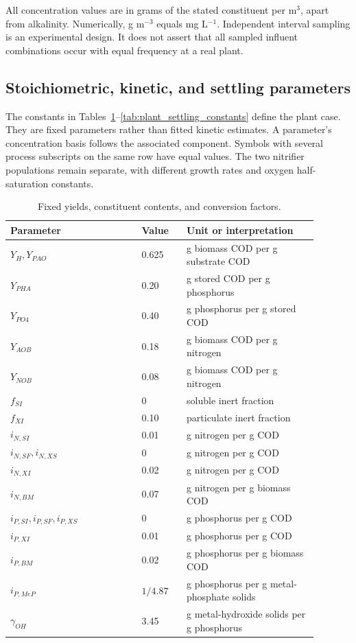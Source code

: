 All concentration values are in grams of the stated constituent per m$^3$, apart from alkalinity. Numerically, g m$^{-3}$ equals mg L$^{-1}$. Independent interval sampling is an experimental design. It does not assert that all sampled influent combinations occur with equal frequency at a real plant.

\subsection{Stoichiometric, kinetic, and settling parameters}

The constants in Tables~\ref{tab:plant_stoichiometric_constants}--\ref{tab:plant_settling_constants} define the plant case. They are fixed parameters rather than fitted kinetic estimates. A parameter's concentration basis follows the associated component. Symbols with several process subscripts on the same row have equal values. The two nitrifier populations remain separate, with different growth rates and oxygen half-saturation constants.

\begin{table}[htbp]
\centering\small
\caption{Fixed yields, constituent contents, and conversion factors.}\label{tab:plant_stoichiometric_constants}
\begin{tabular}{p{0.38\linewidth}p{0.13\linewidth}p{0.38\linewidth}}
\toprule Parameter & Value & Unit or interpretation\\\midrule
$Y_H,Y_{PAO}$ & 0.625 & g biomass COD per g substrate COD\\
$Y_{PHA}$ & 0.20 & g stored COD per g phosphorus\\
$Y_{PO4}$ & 0.40 & g phosphorus per g stored COD\\
$Y_{AOB}$ & 0.18 & g biomass COD per g nitrogen\\
$Y_{NOB}$ & 0.08 & g biomass COD per g nitrogen\\
$f_{SI}$ & 0 & soluble inert fraction\\
$f_{XI}$ & 0.10 & particulate inert fraction\\
$i_{N,SI}$ & 0.01 & g nitrogen per g COD\\
$i_{N,SF},i_{N,XS}$ & 0 & g nitrogen per g COD\\
$i_{N,XI}$ & 0.02 & g nitrogen per g COD\\
$i_{N,BM}$ & 0.07 & g nitrogen per g biomass COD\\
$i_{P,SI},i_{P,SF},i_{P,XS}$ & 0 & g phosphorus per g COD\\
$i_{P,XI}$ & 0.01 & g phosphorus per g COD\\
$i_{P,BM}$ & 0.02 & g phosphorus per g biomass COD\\
$i_{P,MeP}$ & $1/4.87$ & g phosphorus per g metal-phosphate solids\\
$\gamma_{OH}$ & 3.45 & g metal-hydroxide solids per g phosphorus\\
\bottomrule
\end{tabular}
\end{table}

